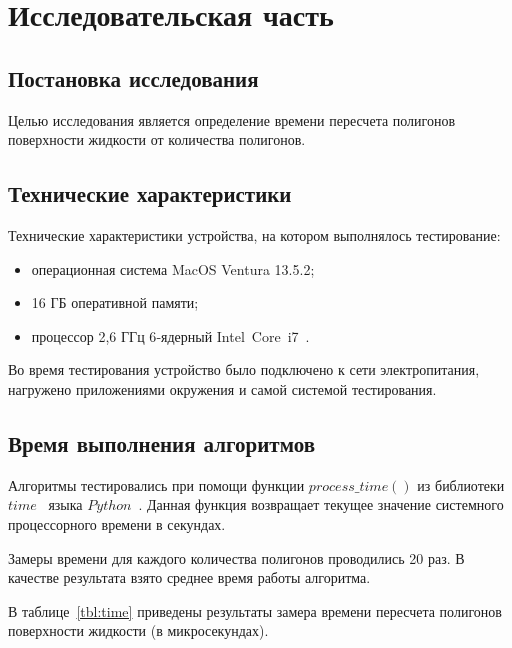 \chapter{Исследовательская часть}

\section{Постановка исследования}

Целью исследования является определение времени пересчета полигонов поверхности жидкости от количества полигонов.


\section{Технические характеристики}

Технические характеристики устройства, на котором выполнялось тестирование:
\begin{itemize}[label={---}]
	\item операционная система MacOS Ventura 13.5.2;
	\item 16 ГБ оперативной памяти;
    \item процессор 2,6 ГГц 6‑ядерный Intel Core i7~\cite{intel}.

\end{itemize}

Во время тестирования устройство было подключено к сети электропитания, нагружено приложениями окружения и самой системой тестирования.

\section{Время выполнения алгоритмов}

Алгоритмы тестировались при помощи функции $process\_time()$ из библиотеки $time$~\cite{pythonlangtime} языка $Python$~\cite{python}. 
Данная функция возвращает текущее значение системного процессорного времени в секундах.

Замеры времени для каждого количества полигонов проводились 20 раз. 
В качестве результата взято среднее время работы алгоритма. 

В таблице~\ref{tbl:time} приведены результаты замера времени пересчета полигонов поверхности жидкости (в микросекундах). 



